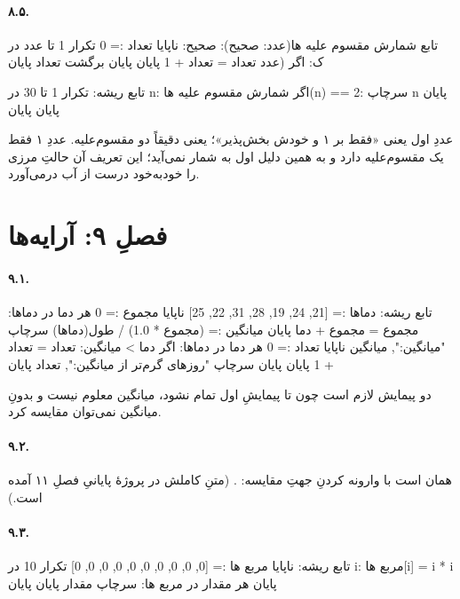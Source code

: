 \paragraph{۸.۵.}
\begin{salamfa}
تابع شمارش مقسوم علیه ها(عدد: صحیح): صحیح:
    ناپایا تعداد := 0
    تکرار 1 تا عدد در ک:
        اگر (عدد %
            تعداد = تعداد + 1
        پایان
    پایان
    برگشت تعداد
پایان

تابع ریشه:
    تکرار 1 تا 30 در n:
        اگر شمارش مقسوم علیه ها(n) == 2:
            سرچاپ n
        پایان
    پایان
پایان
\end{salamfa}
عددِ اول یعنی «فقط بر ۱ و خودش بخش‌پذیر»؛ یعنی دقیقاً دو مقسوم‌علیه.
عددِ ۱ فقط یک مقسوم‌علیه دارد و به همین دلیل اول به شمار نمی‌آید؛ این
تعریف آن حالتِ مرزی را خودبه‌خود درست از آب درمی‌آورد.

\section*{فصلِ ۹: آرایه‌ها}

\paragraph{۹.۱.}
\begin{salamfa}
تابع ریشه:
    دماها := [21, 24, 19, 28, 31, 22, 25]
    ناپایا مجموع := 0
    هر دما در دماها:
        مجموع = مجموع + دما
    پایان
    میانگین := (مجموع * 1.0) / طول(دماها)
    سرچاپ "میانگین:", میانگین
    ناپایا تعداد := 0
    هر دما در دماها:
        اگر دما > میانگین:
            تعداد = تعداد + 1
        پایان
    پایان
    سرچاپ "روزهای گرم‌تر از میانگین:", تعداد
پایان
\end{salamfa}
دو پیمایش لازم است چون تا پیمایشِ اول تمام نشود، میانگین معلوم نیست و
بدونِ میانگین نمی‌توان مقایسه کرد.

\paragraph{۹.۲.} همان  است با وارونه کردنِ جهتِ
مقایسه: . (متنِ کاملش در پروژهٔ پایانیِ فصلِ
۱۱ آمده است.)

\paragraph{۹.۳.}
\begin{salamfa}
تابع ریشه:
    ناپایا مربع ها := [0, 0, 0, 0, 0, 0, 0, 0, 0, 0]
    تکرار 10 در i:
        مربع ها[i] = i * i
    پایان
    هر مقدار در مربع ها:
        سرچاپ مقدار
    پایان
پایان
\end{salamfa}

